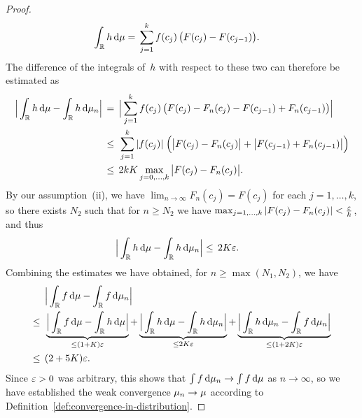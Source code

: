 \begin{proof}
\begin{align*}
  \int_{\mathbb{R}} h \, \mathrm{d} \mu
  = \; & \sum_{j=1}^k f(c_j) \, \big( F(c_j) - F(c_{j-1}) \big) .
  \end{align*}
  The difference of the integrals of~$h$ with respect to these two can
  therefore be estimated as
  \begin{align*}
  \Big| \int_{\mathbb{R}} h \, \mathrm{d} \mu - \int_{\mathbb{R}} h \, \mathrm{d} \mu_n \Big|
  \, = \; & \, \Big| \sum_{j=1}^k f(c_j) \,
      \big( F(c_j) - F_n(c_j) - F(c_{j-1}) +  F_n (c_{j-1}) \big) \Big| \\
  \leq \; & \, \sum_{j=1}^k |f(c_j)| \; \Big(
      \big| F(c_j) - F_n(c_j) \big| + \big| F(c_{j-1}) +  F_n (c_{j-1}) \big|
      \Big) \\
  \leq \; & \, 2 k K \max_{j = 0 , \ldots , k} \big| F(c_j) - F_n(c_j) \big| .
  \end{align*}
  By our assumption~\textup{(ii)}, we have
  $\lim_{n \to \infty} F_n(c_j) = F(c_j)$ for each $j = 1 , \ldots, k$, so
  there exists $N_2$ such that for $n \geq N_2$ we have
  $\max_{j = 1 , \ldots , k} | F(c_j) - F_n(c_j) | < \frac{\varepsilon}{k}$, and
  thus
  \begin{align*}
  \Big| \int_{\mathbb{R}} h \, \mathrm{d} \mu - \int_{\mathbb{R}} h \, \mathrm{d} \mu_n \Big|
  \leq \; & \, 2 K \varepsilon .
  \end{align*}
  Combining the estimates we have obtained, for $n \geq \max(N_1 , N_2)$, we have
  \begin{align*}
  & \Big| \int_{\mathbb{R}} f \, \mathrm{d} \mu - \int_{\mathbb{R}} f \, \mathrm{d} \mu_n \Big| \\
  \leq \; \, &
      \underbrace{
      \Big| \int_{\mathbb{R}} f \, \mathrm{d} \mu - \int_{\mathbb{R}} h \, \mathrm{d} \mu \Big|}_{
          \leq (1+K) \varepsilon}
      + \underbrace{
      \Big| \int_{\mathbb{R}} h \, \mathrm{d} \mu - \int_{\mathbb{R}} h \, \mathrm{d} \mu_n \Big|}_{
          \leq 2 K \varepsilon}
      + \underbrace{
      \Big| \int_{\mathbb{R}} h \, \mathrm{d} \mu_n - \int_{\mathbb{R}} f \, \mathrm{d} \mu_n	\Big|}_{
          \leq (1+2K) \varepsilon } \\
  \leq \; \, & (2 + 5 K) \varepsilon .
  \end{align*}
  Since $\varepsilon > 0$ was arbitrary, this shows that
  $\int f \, \mathrm{d} \mu_n \to \int f \, \mathrm{d} \mu$ as $n \to \infty$, so we
  have established the weak convergence $\mu_n \to \mu$
  according to Definition~\ref{def:convergence-in-distribution}.
\end{proof}
